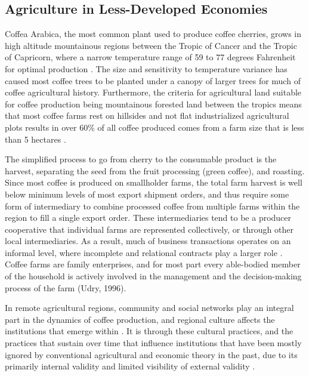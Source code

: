 \documentclass[../main.tex]{subfiles}
\begin{document}
\subsection{Agriculture in Less-Developed Economies}

Coffea Arabica, the most common plant used to produce coffee cherries, grows in high altitude mountainous regions between the Tropic of Cancer and the Tropic of Capricorn, where a narrow temperature range of 59 to 77 degrees Fahrenheit for optimal production \parencite{thurston_coffee_2013}. The size and sensitivity to temperature variance has caused most coffee trees to be planted under a canopy of larger trees for much of coffee agricultural history. Furthermore, the criteria for agricultural land suitable for coffee production being mountainous forested land between the tropics means that most coffee farms rest on hillsides and not flat industrialized agricultural plots results in over 60\% of all coffee produced comes from a farm size that is less than 5 hectares \parencite{siles_smallholder_2022}.  

The simplified process to go from cherry to the consumable product is the harvest, separating the seed from the fruit processing (green coffee), and roasting. Since most coffee is produced on smallholder farms, the total farm harvest is well below minimum levels of most export shipment orders, and thus require some form of intermediary to combine processed coffee from multiple farms within the region to fill a single export order. These intermediaries tend to be a producer cooperative that individual farms are represented collectively, or through other local intermediaries. As a result, much of business transactions operates on an informal level, where incomplete and relational contracts play a larger role \parencite{macchiavello_competition_2021}. Coffee farms are family enterprises, and for most part every able-bodied member of the household is actively involved in the management and the decision-making process of the farm (Udry, 1996). 

In remote agricultural regions, community and social networks play an integral part in the dynamics of coffee production, and regional culture affects the institutions that emerge within \parencite{north_institutions_1991}. It is through these cultural practices, and the practices that sustain over time that influence institutions that have been mostly ignored by conventional agricultural and economic theory in the past, due to its primarily internal validity and limited visibility of external validity \parencite{corno_age_2020, jacoby_watta_2010, nunn_relationship-specificity_2007, ostrom_governing_1990}.
\end{document}
